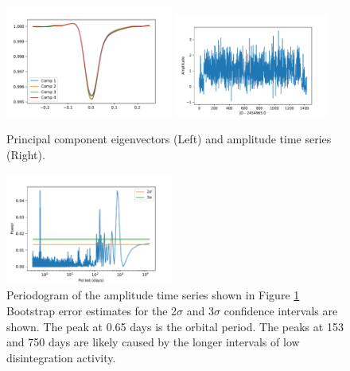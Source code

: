 \documentclass[preprint]{aastex61}
\begin{document}
\begin{figure}[!hbtp]
\begin{centering}
\includegraphics[width=0.49\textwidth]{images/kepler/pca_k1255.pdf}
\includegraphics[width=0.45\textwidth]{images/kepler/amplitude_series.pdf}
\caption{Principal component eigenvectors (Left) and amplitude time series (Right).}\label{fig:PCAamp}
\end{centering}
\end{figure}

\begin{figure}[!hbtp]
\begin{centering}
\includegraphics[width=0.49\textwidth]{images/kepler/amplitude_periodogram.pdf}
\caption{Periodogram of the amplitude time series shown in Figure \ref{fig:PCAamp}
Bootstrap error estimates for the 2$\sigma$ and 3$\sigma$ confidence intervals are shown.
The peak at 0.65 days is the orbital period.
The peaks at 153 and 750 days are likely caused by the longer intervals of low disintegration activity.}\label{fig:periodogram}
\end{centering}
\end{figure}
\end{document}
